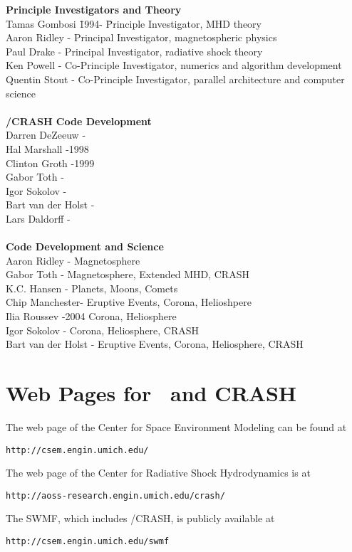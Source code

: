 \begin{tabbing}
{\bf Principle Investigators and Theory} \\
Tamas Gombosi \hspace{.25in} \= 1994- \hspace{0.35in} \= 
                          Principle Investigator, MHD theory \\
Aaron Ridley   -     \> Principal Investigator, magnetospheric physics \\
Paul Drake     -     \> Principal Investigator, radiative shock theory \\
Ken Powell     -     \> Co-Principle Investigator, numerics and algorithm development \\
Quentin Stout  -     \> Co-Principle Investigator, 
                          parallel architecture and computer science \\
\> \> \\
{\bf \BATSRUS/CRASH Code Development} \\
Darren DeZeeuw -     \>  \\
Hal Marshall   -1998 \>  \\
Clinton Groth  -1999 \>  \\ 
Gabor Toth     -     \>  \\
Igor Sokolov   -     \>  \\
Bart van der Holst - \>  \\
Lars Daldorff  -     \>  \\
\> \> \\
{\bf Code Development and Science} \\
Aaron Ridley   -     \> Magnetosphere \\
Gabor Toth     -     \> Magnetosphere, Extended MHD, CRASH \\
K.C. Hansen    -     \> Planets, Moons, Comets \\
Chip Manchester-     \> Eruptive Events, Corona, Helioshpere \\
Ilia Roussev   -2004 \> Corona, Heliosphere \\
Igor Sokolov   -     \> Corona, Heliosphere, CRASH \\
Bart van der Holst - \> Eruptive Events, Corona, Heliosphere, CRASH \\
\end{tabbing}

\section{Web Pages for \BATSRUS\ and CRASH}
The web page of the Center for Space Environment Modeling can be found at
\begin{verbatim}
http://csem.engin.umich.edu/
\end{verbatim}
The web page of the Center for Radiative Shock Hydrodynamics is at
\begin{verbatim}
http://aoss-research.engin.umich.edu/crash/
\end{verbatim}
The SWMF, which includes \BATSRUS/CRASH, is publicly available at
\begin{verbatim}
http://csem.engin.umich.edu/swmf
\end{verbatim}
